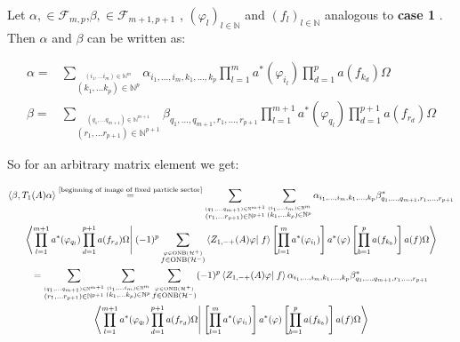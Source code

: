 \documentclass[a4paper,12pt]{article}
\newcommand{\equaltext}[1]{\ensuremath{\stackrel{\text{#1}}{=}}}
\begin{document}
Let \(\alpha,  \in \mathcal{F}_{m,p}\),\(\beta,  \in \mathcal{F}_{m+1,p+1}\) , \( (\varphi_l )_{l\in \mathbb{N}} \)  and \( (f_l )_{l\in \mathbb{N}} \)  analogous to {\bf case 1} . Then \(\alpha\) and \(\beta\) can be written as:

\begin{equation}
\begin{aligned}
\alpha=&\sum_{\stackrel{(i_1,\dots i_m)\in \mathbb{N}^m}{(k_1,\dots k_p)\in \mathbb{N}^p}} \alpha_{i_1,\dots, i_m, k_1, \dots, k_p} \prod_{l=1}^m a^*(\varphi_{i_l}) \prod_{d=1}^p a(f_{k_d})\Omega
\\
\beta=&\sum_{\stackrel{(q_1,\dots q_{m+1})\in \mathbb{N}^{m+1}}{(r_1,\dots r_{p+1})\in \mathbb{N}^{p+1}}} \beta_{q_1,\dots, q_{m+1}, r_1, \dots, r_{p+1}} \prod_{l=1}^{m+1} a^*(\varphi_{q_l}) \prod_{d=1}^{p+1} a(f_{r_d})\Omega
\end{aligned}
\end{equation} 

So for an arbitrary matrix element we get:

\begin{multline}
\left< \beta, T_1(A) \alpha \right>\equaltext{\eqref{beginning of image of fixed particle sector}} 
\sum_{\stackrel{(q_1,\dots q_{m+1})\in \mathbb{N}^{m+1}}{(r_1,\dots r_{p+1})\in \mathbb{N}^{p+1}}}\sum_{\stackrel{(i_1,\dots i_m)\in \mathbb{N}^m}{(k_1,\dots k_p)\in \mathbb{N}^p}} \alpha_{i_1,\dots, i_m, k_1, \dots, k_p} \beta^*_{q_1,\dots, q_{m+1}, r_1, \dots, r_{p+1}} \\
\left<  \prod_{l=1}^{m+1} a^*(\varphi_{q_l}) \prod_{d=1}^{p+1} a(f_{r_d})\Omega \right| \left. (-1)^{p}\sum_{\stackrel{\varphi \in \text{ONB}(\mathcal{H}^+)}{f\in \text{ONB}(\mathcal{H}^-)}}\left<Z_{1,-+}(A)\varphi\right|\left. f\right>
\left[\prod_{l=1}^m a^*(\varphi_{i_{l}})\right] a^*(\varphi)\left[\prod_{b=1}^p a(f_{k_{b}}) \right]
 a(f) \Omega\right>\\
 =\sum_{\stackrel{(q_1,\dots q_{m+1})\in \mathbb{N}^{m+1}}{(r_1,\dots r_{p+1})\in \mathbb{N}^{p+1}}}\sum_{\stackrel{(i_1,\dots i_m)\in \mathbb{N}^m}{(k_1,\dots k_p)\in \mathbb{N}^p}}\sum_{\stackrel{\varphi \in \text{ONB}(\mathcal{H}^+)}{f\in \text{ONB}(\mathcal{H}^-)}} (-1)^{p}\left<Z_{1,-+}(A)\varphi\right|\left. f\right>\alpha_{i_1,\dots, i_m, k_1, \dots, k_p} \beta^*_{q_1,\dots, q_{m+1}, r_1, \dots, r_{p+1}} \\
\left<  \prod_{l=1}^{m+1} a^*(\varphi_{q_l}) \prod_{d=1}^{p+1} a(f_{r_d})\Omega \right| \left. 
\left[\prod_{l=1}^m a^*(\varphi_{i_{l}})\right] a^*(\varphi)\left[\prod_{b=1}^p a(f_{k_{b}}) \right]
 a(f) \Omega\right>
\end{multline}
\end{document}
